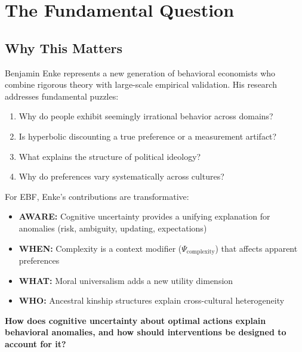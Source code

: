 \section{The Fundamental Question}
\label{sec:enk-fundamental}

\subsection{Why This Matters}

Benjamin Enke represents a new generation of behavioral economists who
combine rigorous theory with large-scale empirical validation. His research
addresses fundamental puzzles:

\begin{enumerate}
    \item Why do people exhibit seemingly irrational behavior across domains?
    \item Is hyperbolic discounting a true preference or a measurement artifact?
    \item What explains the structure of political ideology?
    \item Why do preferences vary systematically across cultures?
\end{enumerate}

For EBF, Enke's contributions are transformative:
\begin{itemize}[nosep]
    \item \textbf{AWARE:} Cognitive uncertainty provides a unifying explanation
          for anomalies (risk, ambiguity, updating, expectations)
    \item \textbf{WHEN:} Complexity is a context modifier ($\Psi_{\text{complexity}}$)
          that affects apparent preferences
    \item \textbf{WHAT:} Moral universalism adds a new utility dimension
    \item \textbf{WHO:} Ancestral kinship structures explain cross-cultural heterogeneity
\end{itemize}

\begin{tcolorbox}[colback=red!5!white, colframe=red!75!black,
    title=The Fundamental Question]
\textbf{How does cognitive uncertainty about optimal actions explain behavioral
anomalies, and how should interventions be designed to account for it?}
\end{tcolorbox}



